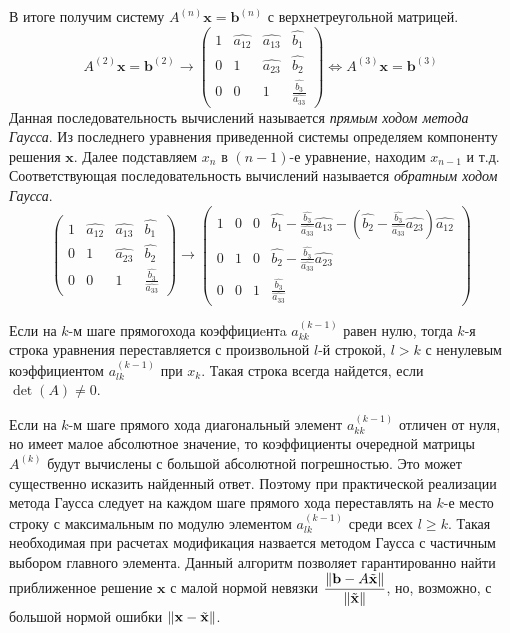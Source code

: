 В итоге получим систему $A^{(n)}\mathbf{x}=\mathbf{b}^{(n)}$ с верхнетреугольной матрицей.
\[
  A^{(2)}\mathbf{x}=\mathbf{b}^{(2)}\rightarrow
  \left(\begin{array}{ccc|c}
      1 & \widehat{a_{12}} & \widehat{a_{13}} & \widehat{b_{1}}                          \\
      0 & 1                & \widehat{a_{23}} & \widehat{b_{2}}                          \\
      0 & 0                & 1                & \frac{\widehat{b_{3}}}{\widehat{a_{33}}}
    \end{array}\right)\Leftrightarrow A^{(3)}\mathbf{x}=\mathbf{b}^{(3)}
\]
Данная последовательность вычислений называется \textit{прямым ходом метода Гаусса}.
Из последнего уравнения приведенной системы определяем компоненту решения $\mathbf{x}$.
Далее подставляем $x_n$ в $(n-1)$-е уравнение, находим $x_{n-1}$ и т.д.
Соответствующая последовательность вычислений называется \textit{обратным ходом Гаусса}.
\[
  \left(\begin{array}{ccc|c}
      1 & \widehat{a_{12}} & \widehat{a_{13}} & \widehat{b_{1}}                          \\
      0 & 1                & \widehat{a_{23}} & \widehat{b_{2}}                          \\
      0 & 0                & 1                & \frac{\widehat{b_{3}}}{\widehat{a_{33}}}
    \end{array}\right)\rightarrow
  \left(\begin{array}{ccc|c}
      1 & 0 & 0 & \widehat{b_{1}} - \frac{\widehat{b_{3}}}{\widehat{a_{33}}}\widehat{a_{13}} - \left(\widehat{b_{2}} - \frac{\widehat{b_{3}}}{\widehat{a_{33}}}\widehat{a_{23}}\right)\widehat{a_{12}} \\
      0 & 1 & 0 & \widehat{b_{2}} - \frac{\widehat{b_{3}}}{\widehat{a_{33}}}\widehat{a_{23}}                                                                                                           \\
      0 & 0 & 1 & \frac{\widehat{b_{3}}}{\widehat{a_{33}}}
    \end{array}\right)
\]

Если на $k$-м шаге прямогохода коэффициeнтa $a_{kk}^{(k-1)}$ равен нулю,
тогда $k$-я строка уравнения переставляется с произвольной $l$-й строкой,
$l>k$ с ненулевым коэффициентом $a_{lk}^{(k-1)}$ при $x_k$.
Такая строка всегда найдется, если $\det(A)\neq0$.

Если на $k$-м шаге прямого хода диагональный элемент $a_{kk}^{(k-1)}$ отличен
от нуля, но имеет малое абсолютное значение, то коэффициенты очередной матрицы
$A^{(k)}$ будут вычислены с большой абсолютной погрешностью.
Это может существенно исказить найденный ответ. Поэтому при практической
реализации метода Гаусса следует на каждом шаге прямого хода переставлять на
$k$-е место строку с максимальным по модулю элементом $a_{lk}^{(k-1)}$ среди
всех $l\geq k$. Такая необходимая при расчетах модификация назвается
методом Гаусса с частичным выбором главного элемента. Данный
алгоритм позволяет гарантированно найти приближенное решение $\mathbf{x}$ с малой
нормой невязки $\dfrac{\left\lVert\mathbf{b}-A\tilde{\mathbf{x}}\right\rVert}{\left\lVert\tilde{\mathbf{x}}\right\rVert}$, но, возможно,
с большой нормой ошибки $\left\lVert\mathbf{x}-\tilde{\mathbf{x}}\right\rVert$.


